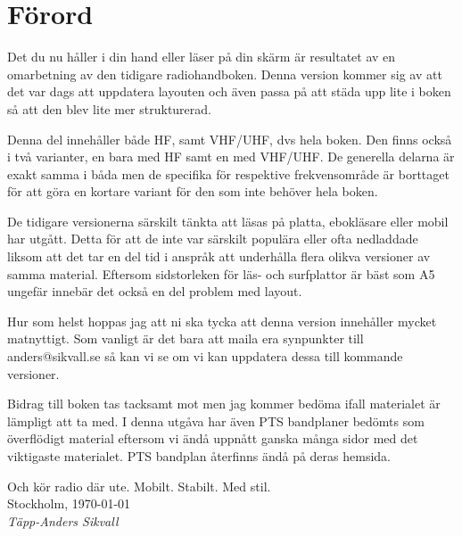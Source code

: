 \section*{Förord}

Det du nu håller i din hand eller läser på din skärm är resultatet av en omarbetning av den tidigare radiohandboken. Denna version kommer sig av att det var dags att uppdatera layouten och även passa på att städa upp lite i boken så att den blev lite mer strukturerad.

Denna del innehåller både HF, samt VHF/UHF, dvs hela boken. Den finns också i två varianter, en bara med HF samt en med VHF/UHF. De generella delarna är exakt samma i båda men de specifika för respektive frekvensområde är borttaget för att göra en kortare variant för den som inte behöver hela boken.

De tidigare versionerna särskilt tänkta att läsas på platta, ebokläsare eller mobil har utgått. Detta för att de inte var särskilt populära eller ofta nedladdade liksom att det tar en del tid i anspråk att underhålla flera olikva versioner av samma material. Eftersom sidstorleken för läs- och surfplattor är bäst som A5 ungefär innebär det också en del problem med layout.

Hur som helst hoppas jag att ni ska tycka att denna version innehåller mycket matnyttigt. Som vanligt är det bara att maila era synpunkter till anders@sikvall.se så kan vi se om vi kan uppdatera dessa till kommande versioner.

Bidrag till boken tas tacksamt mot men jag kommer bedöma ifall materialet är lämpligt att ta med. I denna utgåva har även PTS bandplaner bedömts som överflödigt material eftersom vi ändå uppnått ganska många sidor med det viktigaste materialet. PTS bandplan återfinns ändå på deras hemsida.

Och kör radio där ute. Mobilt. Stabilt. Med stil.\\[4em]

Stockholm, \today\\
\textit{Täpp-Anders Sikvall}

\clearpage